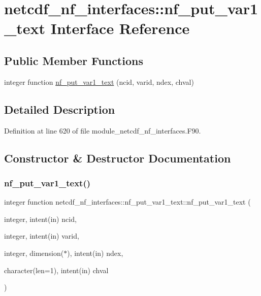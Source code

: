 \hypertarget{interfacenetcdf__nf__interfaces_1_1nf__put__var1__text}{}\section{netcdf\+\_\+nf\+\_\+interfaces\+:\+:nf\+\_\+put\+\_\+var1\+\_\+text Interface Reference}
\label{interfacenetcdf__nf__interfaces_1_1nf__put__var1__text}
\subsection*{Public Member Functions}
\begin{DoxyCompactItemize}
\item 
integer function \hyperlink{interfacenetcdf__nf__interfaces_1_1nf__put__var1__text_a1c10cd0024c6b416c148bb4c7ab5b103}{nf\+\_\+put\+\_\+var1\+\_\+text} (ncid, varid, ndex, chval)
\end{DoxyCompactItemize}


\subsection{Detailed Description}


Definition at line 620 of file module\+\_\+netcdf\+\_\+nf\+\_\+interfaces.\+F90.



\subsection{Constructor \& Destructor Documentation}
\mbox{\label{interfacenetcdf__nf__interfaces_1_1nf__put__var1__text_a1c10cd0024c6b416c148bb4c7ab5b103}} 
\subsubsection{\texorpdfstring{nf\+\_\+put\+\_\+var1\+\_\+text()}{nf\_put\_var1\_text()}}
{\footnotesize\ttfamily integer function netcdf\+\_\+nf\+\_\+interfaces\+::nf\+\_\+put\+\_\+var1\+\_\+text\+::nf\+\_\+put\+\_\+var1\+\_\+text (\begin{DoxyParamCaption}\item[{integer, intent(in)}]{ncid,  }\item[{integer, intent(in)}]{varid,  }\item[{integer, dimension($\ast$), intent(in)}]{ndex,  }\item[{character(len=1), intent(in)}]{chval }\end{DoxyParamCaption})}



